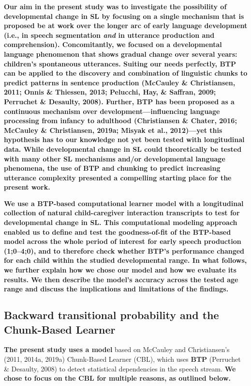 \documentclass[
  english,
  man,mask,floatsintext]{apa6}
\begin{document}
\textbf{Our aim in the present study was to investigate the possibility of developmental change in SL by focusing on a single mechanism that is proposed be at work over the longer arc of early language development (i.e., in speech segmentation \emph{and} in utterance production and comprehension). Concomitantly, we focused on a developmental language phenomenon that shows gradual change over several years: children's spontaneous utterances. Suiting our needs perfectly, BTP can be applied to the discovery and combination of linguistic chunks to predict patterns in sentence production (McCauley \& Christiansen, 2011; Onnis \& Thiessen, 2013; Pelucchi, Hay, \& Saffran, 2009; Perruchet \& Desaulty, 2008). Further, BTP has been proposed as a continuous mechanism over development---influencing language processing from infancy to adulthood (Christiansen \& Chater, 2016; McCauley \& Christiansen, 2019a; Misyak et al., 2012)---yet this hypothesis has to our knowledge not yet been tested with longitudinal data. While developmental change in SL could theoretically be tested with many other SL mechanisms and/or developmental language phenomena, the use of BTP and chunking to predict increasing utterance complexity presented a compelling starting place for the present work.}

\textbf{We use a BTP-based computational learner model with a longitudinal collection of natural child-caregiver interaction transcripts to test for developmental change in SL. This computational modeling approach enabled us to define and test the goodness-of-fit of the BTP-based model across the whole period of interest for early speech production (1;0--4;0), and to therefore check whether BTP's performance changed for each child within the studied developmental range. In what follows, we further explain how we chose our model and how we evaluate its results. We then describe the model's accuracy across the tested age range and discuss the implications and limitations of the findings.}

\hypertarget{backward-transitional-probability-and-the-chunk-based-learner}{%
\subsection{\texorpdfstring{\textbf{Backward transitional probability} and the Chunk-Based Learner}{Backward transitional probability and the Chunk-Based Learner}}\label{backward-transitional-probability-and-the-chunk-based-learner}}

\textbf{The present study uses a model} based on McCauley and Christiansen's (2011, 2014a, 2019a) Chunk-Based Learner (CBL), which uses \textbf{BTP} (Perruchet \& Desaulty, 2008) to detect statistical dependencies in the speech stream. \textbf{We chose to focus on the CBL for multiple reasons, as outlined below.}
\end{document}
